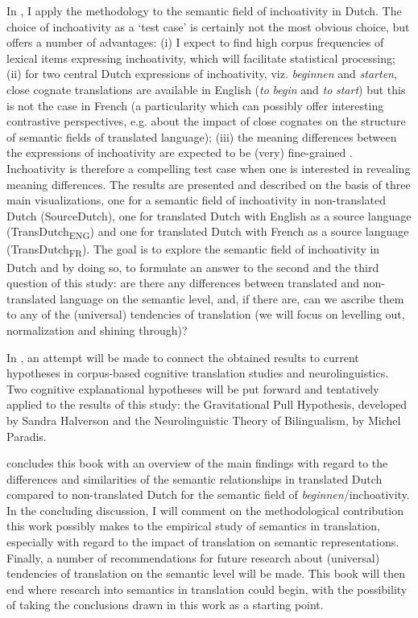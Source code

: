 In , I apply the methodology to the semantic field of inchoativity in Dutch. The choice of inchoativity as a ‘test case’ is certainly not the most obvious choice, but offers a number of advantages: (i) I expect to find high corpus frequencies of lexical items expressing inchoativity, which will facilitate statistical processing; (ii) for two central Dutch expressions of inchoativity, viz. \textit{beginnen} and \textit{starten}, close cognate translations are available in English (\textit{to} \textit{begin} and \textit{to} \textit{start}) but this is not the case in French (a particularity which can possibly offer interesting contrastive perspectives, e.g. about the impact of close cognates on the structure of semantic fields of translated language); (iii) the meaning differences between the expressions of inchoativity are expected to be (very) fine-grained \citep{zettersten_introspection_1996}. Inchoativity is therefore a compelling test case when one is interested in revealing meaning differences. The results are presented and described on the basis of three main visualizations, one for a semantic field of inchoativity in non-translated Dutch (SourceDutch), one for translated Dutch with English as a source language (TransDutch\textsubscript{ENG}) and one for translated Dutch with French as a source language (TransDutch\textsubscript{FR}). The goal is to explore the semantic field of inchoativity in Dutch and by doing so, to formulate an answer to the second and the third question of this study: are there any differences between translated and non-translated language on the semantic level, and, if there are, can we ascribe them to any of the (universal) tendencies of translation (we will focus on levelling out, normalization and shining through)?

In , an attempt will be made to connect the obtained results to current hypotheses in corpus-based cognitive translation studies and neurolinguistics. Two cognitive explanational hypotheses will be put forward and tentatively applied to the results of this study: the Gravitational Pull Hypothesis, developed by Sandra Halverson and the Neurolinguistic Theory of Bilingualism, by Michel Paradis.

 concludes this book with an overview of the main findings with regard to the differences and similarities of the semantic relationships in translated Dutch compared to non-translated Dutch for the semantic field of \textit{beginnen}/inchoativity. In the concluding discussion, I will comment on the methodological contribution this work possibly makes to the empirical study of semantics in translation, especially with regard to the impact of translation on semantic representations. Finally, a number of recommendations for future research about (universal) tendencies of translation on the semantic level will be made. This book will then end where research into semantics in translation could begin, with the possibility of taking the conclusions drawn in this work as a starting point.
